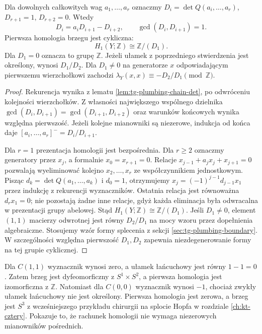 \begin{stwierdzenie}
\label{st:tg-plumbing-chain-homology}
Dla dowolnych całkowitych wag $a_1,\ldots,a_r$
oznaczmy $D_i=\det Q(a_i,\ldots,a_r)$,
$D_{r+1}=1$, $D_{r+2}=0$. Wtedy
\[
D_i=a_iD_{i+1}-D_{i+2},\qquad
\gcd(D_i,D_{i+1})=1.
\]
Pierwsza homologia brzegu jest cykliczna:
\[
H_1(Y;\mathbb Z)\cong\mathbb Z/(D_1).
\]
Dla $D_1=0$ oznacza to grupę $\mathbb Z$.
Jeżeli ułamek z poprzedniego stwierdzenia
jest określony, wynosi $D_1/D_2$.
Dla $D_1\ne0$ na generatorze $x$ odpowiadającym
pierwszemu wierzchołkowi zachodzi
$\lambda_Y(x,x)\equiv-D_2/D_1\pmod{\mathbb Z}$.
\end{stwierdzenie}
\begin{proof}
Rekurencja wynika z lematu
\ref{lem:tg-plumbing-chain-det}, po odwróceniu
kolejności wierzchołków. Z własności
największego wspólnego dzielnika
$\gcd(D_i,D_{i+1})=\gcd(D_{i+1},D_{i+2})$
oraz warunków końcowych wynika względna pierwszość.
Jeżeli kolejne mianowniki są niezerowe,
indukcja od końca daje
$[a_i,\ldots,a_r]^-=D_i/D_{i+1}$.

Dla $r=1$ prezentacja homologii jest bezpośrednia.
Dla $r\ge2$ oznaczmy generatory przez $x_j$,
a formalnie $x_0=x_{r+1}=0$.
Relacje $x_{j-1}+a_jx_j+x_{j+1}=0$
pozwalają wyeliminować kolejno
$x_2,\ldots,x_r$ ze współczynnikiem jednostkowym.
Pisząc $d_k=\det Q(a_1,\ldots,a_k)$
i $d_0=1$, otrzymujemy
$x_j=(-1)^{j-1}d_{j-1}x_1$ przez indukcję
z rekurencji wyznaczników.
Ostatnia relacja jest równoważna $d_rx_1=0$;
nie pozostają żadne inne relacje,
gdyż każda eliminacja była odwracalna
w prezentacji grupy abelowej.
Stąd $H_1(Y;\mathbb Z)\cong\mathbb Z/(D_1)$.
Jeśli $D_1\ne0$, element $(1,1)$ macierzy
odwrotnej jest równy $D_2/D_1$ na mocy
wzoru przez dopełnienia algebraiczne.
Stosujemy wzór formy splecenia z sekcji
\ref{sec:tg-plumbing-boundary}.
W szczególności względna pierwszość
$D_1,D_2$ zapewnia niezdegenerowanie
formy na tej grupie cyklicznej.
\end{proof}

\begin{przyklad}
Dla $C(1,1)$ wyznacznik wynosi zero,
a ułamek łańcuchowy jest równy $1-1=0$.
Zatem brzeg jest dyfeomorficzny z
$S^1\times S^2$, a pierwsza homologia
jest izomorficzna z $\mathbb Z$.
Natomiast dla $C(0,0)$ wyznacznik wynosi
$-1$, chociaż zwykły ułamek łańcuchowy
nie jest określony. Pierwsza homologia
jest zerowa, a brzeg jest $S^3$
z wcześniejszego przykładu chirurgii
na splocie Hopfa w rozdziale
\ref{ch:kt-cztery}. Pokazuje to, że
rachunek homologii nie wymaga niezerowych
mianowników pośrednich.
\end{przyklad}

